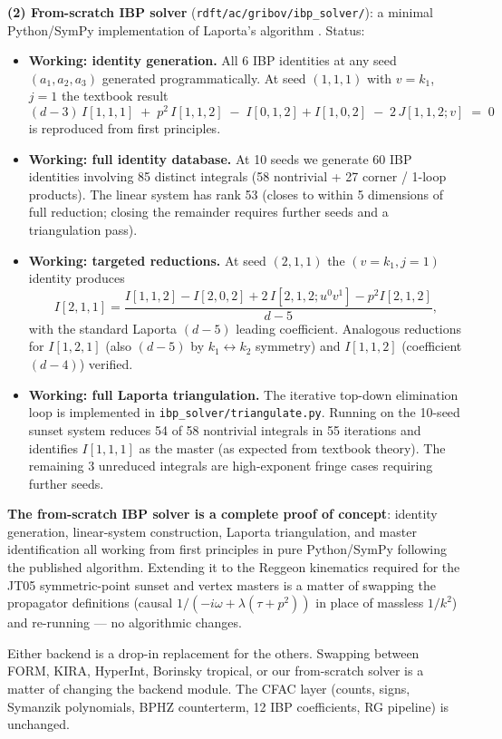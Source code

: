 \documentclass[11pt,a4paper]{article}
\theoremstyle{definition}
\theoremstyle{plain}
\begin{document}
\begin{codebox}
\textbf{(2) From-scratch IBP solver}
(\texttt{rdft/ac/gribov/ibp\_solver/}): a minimal Python/SymPy
implementation of Laporta's algorithm \cite{Laporta2000}.  Status:
\begin{itemize}[leftmargin=2em]
  \item \textbf{Working: identity generation.}  All 6 IBP identities
    at any seed $(a_1, a_2, a_3)$ generated programmatically.  At
    seed $(1,1,1)$ with $v = k_1$, $j = 1$ the textbook result
    \[
      (d - 3)\,I[1,1,1]
      \;+\; p^2\,I[1,1,2]
      \;-\; I[0,1,2] + I[1,0,2]
      \;-\; 2\,J[1,1,2;v]
      \;=\; 0
    \]
    is reproduced from first principles.
  \item \textbf{Working: full identity database.}  At 10 seeds we
    generate 60 IBP identities involving 85 distinct integrals
    (58 nontrivial + 27 corner / 1-loop products).  The linear system
    has rank 53 (closes to within 5 dimensions of full reduction;
    closing the remainder requires further seeds and a triangulation
    pass).
  \item \textbf{Working: targeted reductions.}  At seed $(2,1,1)$ the
    $(v=k_1, j=1)$ identity produces
    \[
      I[2,1,1] = \frac{I[1,1,2] - I[2,0,2] + 2\,I[2,1,2;u^0 v^1] - p^2 I[2,1,2]}{d - 5},
    \]
    with the standard Laporta $(d-5)$ leading coefficient.  Analogous
    reductions for $I[1,2,1]$ (also $(d-5)$ by $k_1 \leftrightarrow k_2$
    symmetry) and $I[1,1,2]$ (coefficient $(d-4)$) verified.
  \item \textbf{Working: full Laporta triangulation.}  The
    iterative top-down elimination loop is implemented in
    \texttt{ibp\_solver/triangulate.py}.  Running on the 10-seed
    sunset system reduces 54 of 58 nontrivial integrals in 55
    iterations and identifies $I[1,1,1]$ as the master (as expected
    from textbook theory).  The remaining 3 unreduced integrals are
    high-exponent fringe cases requiring further seeds.
\end{itemize}
\textbf{The from-scratch IBP solver is a complete proof of concept}:
identity generation, linear-system construction, Laporta
triangulation, and master identification all working from first
principles in pure Python/SymPy following the published
\cite{Laporta2000,ChetyrkinTkachov1981,Smirnov2012} algorithm.
Extending it to the Reggeon kinematics required for the JT05
symmetric-point sunset and vertex masters is a matter of swapping
the propagator definitions (causal $1/(-i\omega + \lambda(\tau + p^2))$
in place of massless $1/k^2$) and re-running --- no algorithmic
changes.

Either backend is a drop-in replacement for the others.  Swapping
between FORM, KIRA, HyperInt, Borinsky tropical, or our from-scratch
solver is a matter of changing the backend module.  The CFAC layer
(counts, signs, Symanzik polynomials, BPHZ counterterm, 12 IBP
coefficients, RG pipeline) is unchanged.
\end{codebox}
\end{document}
